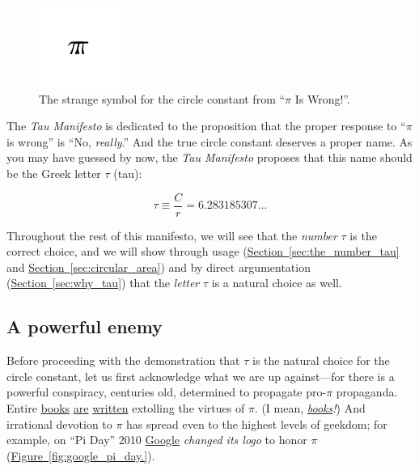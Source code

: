 \documentclass{article}
\begin{document}
\begin{figure}
\begin{center}
\includegraphics{images/figures/palais-tau.png}
\end{center}
\caption{The strange symbol for the circle constant from ``$\pi$ Is Wrong!''.\label{fig:palais_tau}}
\end{figure}

The \emph{Tau Manifesto} is dedicated to the proposition that the proper response to ``$\pi$ is wrong'' is ``No, \emph{really}.'' And the true circle constant deserves a proper name. As you may have guessed by now, the \emph{Tau Manifesto} proposes that this name should be the Greek letter $\tau$ (tau):

\[
  \tau \equiv \frac{C}{r} = 6.283185307\ldots
\]

Throughout the rest of this manifesto, we will see that the \emph{number} $\tau$ is the correct choice, and we will show through usage (\hyperref[sec:the_number_tau]{Section~}\ref{sec:the_number_tau} and \hyperref[sec:circular_area]{Section~}\ref{sec:circular_area}) and by direct argumentation (\hyperref[sec:why_tau]{Section~}\ref{sec:why_tau}) that the \emph{letter} $\tau$ is a natural choice as well.

 \subsection{A powerful enemy} %
 \label{sec:a_powerful_enemy}

Before proceeding with the demonstration that $\tau$ is the natural choice for the circle constant, let us first acknowledge what we are up against---for there is a powerful conspiracy, centuries old, determined to propagate pro-$\pi$ propaganda. Entire \href{http://www.amazon.com/exec/obidos/ISBN=0802713327/parallaxproductiA/}{books} \href{http://www.amazon.com/Pi-Sky-Counting-Thinking-Being/dp/0198539568}{are} \href{http://www.amazon.com/exec/obidos/ISBN=0312381859/parallaxproductiA/}{written} extolling the virtues of $\pi$. (I mean, \href{http://www.amazon.com/exec/obidos/ISBN=0387989463/parallaxproductiA/}{\emph{books}}\emph{!}) And irrational devotion to $\pi$ has spread even to the highest levels of geekdom; for example, on ``Pi Day'' 2010 \href{http://www.google.com/}{Google} \emph{changed its logo} to honor $\pi$  (\hyperref[fig:google_pi_day.]{Figure~}\ref{fig:google_pi_day.}).  
\end{document}
